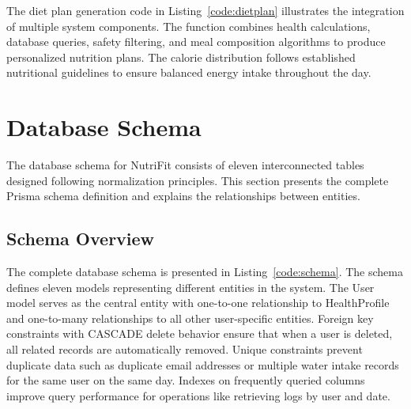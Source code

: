 The diet plan generation code in Listing~\ref{code:dietplan} illustrates the integration of multiple system components. The function combines health calculations, database queries, safety filtering, and meal composition algorithms to produce personalized nutrition plans. The calorie distribution follows established nutritional guidelines to ensure balanced energy intake throughout the day.

\section{Database Schema}

The database schema for NutriFit consists of eleven interconnected tables designed following normalization principles. This section presents the complete Prisma schema definition and explains the relationships between entities.

\subsection{Schema Overview}

The complete database schema is presented in Listing~\ref{code:schema}. The schema defines eleven models representing different entities in the system. The User model serves as the central entity with one-to-one relationship to HealthProfile and one-to-many relationships to all other user-specific entities. Foreign key constraints with CASCADE delete behavior ensure that when a user is deleted, all related records are automatically removed. Unique constraints prevent duplicate data such as duplicate email addresses or multiple water intake records for the same user on the same day. Indexes on frequently queried columns improve query performance for operations like retrieving logs by user and date.

